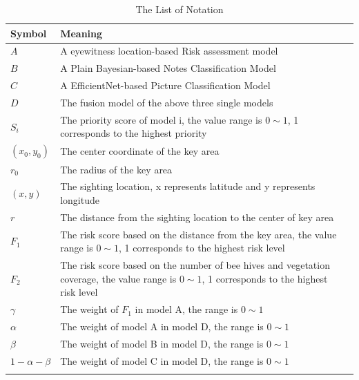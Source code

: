 \documentclass{mcmthesis}
\numberwithin{figure}{section}
\numberwithin{table}{section}
\begin{document}
\begin{center}
\begin{longtable}{p{}p{}m{}}
\caption{The List of Notation}\\
\hline
Symbol& Meaning \\
\hline

$A$      & A eyewitness location-based Risk assessment model
                                                         \\
$B$      & A Plain Bayesian-based Notes Classification Model
                                                          \\
$C$     & A EfficientNet-based Picture Classification Model
                                                        \\
$D$       & The fusion model of the above three single models                                                       \\
$S_i$      & The priority score of model i, the value range is $0 \sim 1$, 1 corresponds to the highest priority
                                                            \\
$(x_0,y_0)$       & The center coordinate of the key area
                                 \\
$r_0$       & The radius of the key area
                                         \\
$(x,y)$       & The sighting location, x represents latitude and y represents longitude
\\
$r$       & The distance from the sighting location to the center of key area \\
$F_1$       & The risk score based on the distance from the key area, the value range is $0 \sim 1$, 1 corresponds to the highest risk level \\
$F_2$      &  The risk score based on the number of bee hives and vegetation coverage, the value range is $0 \sim 1$, 1 corresponds to the highest risk level
\\
$\gamma$      &  The weight of $F_1$ in model A, the range is $0 \sim 1$

\\
$\alpha$       & The weight of model A in model D, the range is $0 \sim 1$

\\
$\beta$       & The weight of model B in model D, the range is $0 \sim 1$
\\
$1-\alpha-\beta$       & The weight of model C in model D, the range is $0 \sim 1$
\\
                                                        \\ \hline

 \end{longtable}
 \end{center}
\end{document}
